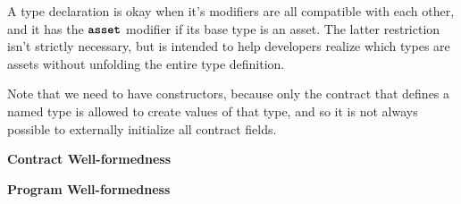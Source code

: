 \documentclass[dvipsnames, usenames, sigconf]{acmart}
\begin{document}
A type declaration is okay when it's modifiers are all compatible with each other, and it has the $\asset$ modifier if its base type is an asset.
The latter restriction isn't strictly necessary, but is intended to help developers realize which types are assets without unfolding the entire type definition.
\begin{mathpar}
\end{mathpar}

Note that we need to have constructors, because only the contract that defines a named type is allowed to create values of that type, and so it is not always possible to externally initialize all contract fields.
\begin{mathpar}
\end{mathpar}

\framebox{$\Con~\ok$} \textbf{Contract Well-formedness}
\begin{mathpar}
\end{mathpar}

\framebox{$\Prog~\ok$} \textbf{Program Well-formedness}
\begin{mathpar}
\end{mathpar}
\end{document}

